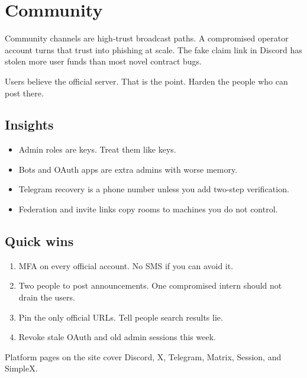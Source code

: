 \chapter{Community}

Community channels are high-trust broadcast paths. A
compromised operator account turns that trust into
phishing at scale. The fake claim link in Discord has
stolen more user funds than most novel contract bugs.

Users believe the official server. That is the point.
Harden the people who can post there.

\section{Insights}

\begin{itemize}
  \item Admin roles are keys. Treat them like keys.
  \item Bots and OAuth apps are extra admins with worse
  memory.
  \item Telegram recovery is a phone number unless you
  add two-step verification.
  \item Federation and invite links copy rooms to
  machines you do not control.
\end{itemize}

\section{Quick wins}

\begin{enumerate}
  \item MFA on every official account. No SMS if you can
  avoid it.
  \item Two people to post announcements. One
  compromised intern should not drain the users.
  \item Pin the only official URLs. Tell people search
  results lie.
  \item Revoke stale OAuth and old admin sessions this
  week.
\end{enumerate}

Platform pages on the site cover Discord, X, Telegram,
Matrix, Session, and SimpleX.
